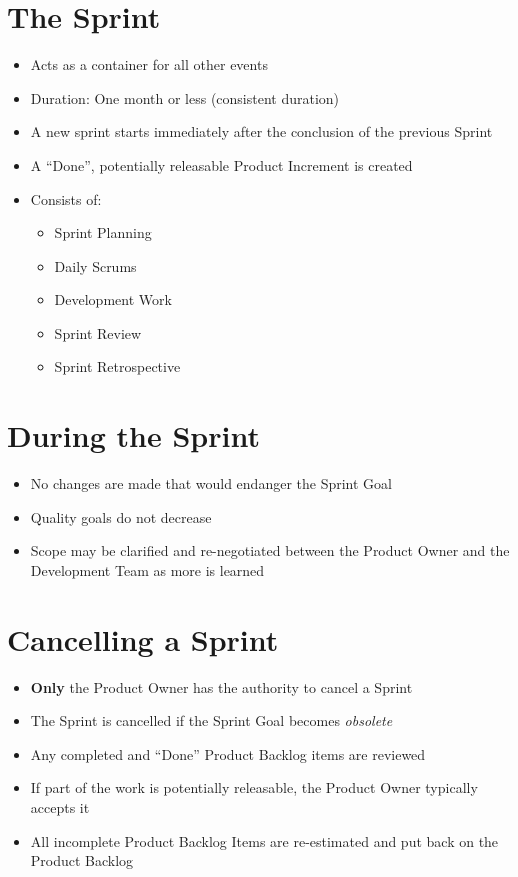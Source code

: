 \documentclass[a4paper,11pt,twocolumn]{article}
\begin{document}
\section*{The Sprint}
\begin{itemize}
    \item Acts as a container for all other events
	\item Duration: One month or less (consistent duration)
	\item A new sprint starts immediately after the conclusion of the previous Sprint
	\item A ``Done'', potentially releasable Product Increment is created
	\item Consists of:
	\vspace{-0.5em}
    \begin{itemize}
        \setlength\itemsep{0em}
        \item Sprint Planning
        \item Daily Scrums
        \item Development Work
        \item Sprint Review
        \item Sprint Retrospective
    \end{itemize}
\end{itemize}

\section*{During the Sprint}
\begin{itemize}
    \item No changes are made that would endanger the Sprint Goal
	\item Quality goals do not decrease
	\item Scope may be clarified and re-negotiated between the Product Owner and the Development Team as more is learned
\end{itemize}

\section*{Cancelling a Sprint}
\begin{itemize}
    \item \textbf{Only} the Product Owner has the authority to cancel a Sprint
	\item The Sprint is cancelled if the Sprint Goal becomes \textit{obsolete}
	\item Any completed and ``Done'' Product Backlog items are reviewed
    \item If part of the work is potentially releasable, the Product Owner typically accepts it
    \item All incomplete Product Backlog Items are re-estimated and put back on the Product Backlog
\end{itemize}
\end{document}
